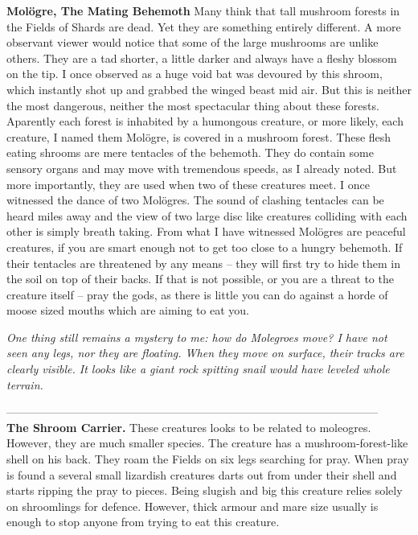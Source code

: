 \documentclass[14p]{book}
\begin{document}
\textbf{Molögre, The Mating Behemoth}
Many think that tall mushroom forests in the Fields of Shards are dead. Yet they are something entirely different. A more observant viewer would notice that some of the large mushrooms are unlike others. They are a tad shorter, a little darker and always have a fleshy blossom on the tip. I once observed as a huge void bat was devoured by this shroom, which instantly shot up and grabbed the winged beast mid air. But this is neither the most dangerous, neither the most spectacular thing about these forests. Aparently each forest is inhabited by a humongous creature, or more likely, each creature, I named them Molögre, is covered in a mushroom forest. These flesh eating shrooms are mere tentacles of the behemoth. They do contain some sensory organs and may move with tremendous speeds, as I already noted. But more importantly, they are used when two of these creatures meet. I once witnessed the dance of two Molögres. The sound of clashing tentacles can be heard miles away and the view of two large disc like creatures colliding with each other is simply breath taking. From what I have witnessed Molögres are peaceful creatures, if you are smart enough not to get too close to a hungry behemoth. If their tentacles are threatened by any means -- they will first try to hide them in the soil on top of their backs. If that is not possible, or you are a threat to the creature itself -- pray the gods, as there is little you can do against a horde of moose sized mouths which are aiming to eat you.

\emph{One thing still remains a mystery to me: how do Molegroes move? I have not seen any legs, nor they are floating. When they move on surface, their tracks are clearly visible. It looks like a giant rock spitting snail would have leveled whole terrain.}


{\color{l} ---------------------------------------------------------------------------------------------------\\}
\textbf{The Shroom Carrier.}
These creatures looks to be related to moleogres. However, they are much smaller species. The creature has a mushroom-forest-like shell on his back. They roam the Fields on six legs searching for pray. When pray is found a several small lizardish creatures darts out from under their shell and starts ripping the pray to pieces. Being slugish and big this creature relies solely on shroomlings for defence. However, thick armour and mare size usually is enough to stop anyone from trying to eat this creature.
\end{document}
